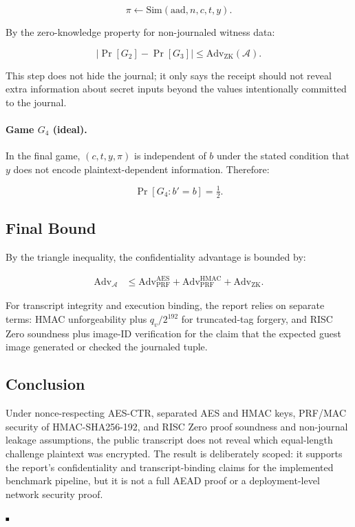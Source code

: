 \[
\pi \leftarrow \mathrm{Sim}(\mathrm{aad}, n, c, t, y).
\]

By the zero-knowledge property for non-journaled witness data:

\[
|\Pr[G_2] - \Pr[G_3]| \leq
\mathrm{Adv}_{\mathrm{ZK}}(\mathcal{A}).
\]

This step does not hide the journal; it only says the receipt should not reveal
extra information about secret inputs beyond the values intentionally committed
to the journal.

\paragraph{Game \(G_4\) (ideal).}
In the final game, \((c, t, y, \pi)\) is independent of \(b\) under the stated
condition that \(y\) does not encode plaintext-dependent information. Therefore:

\[
\Pr[G_4 : b' = b] = \tfrac{1}{2}.
\]

\subsection{Final Bound}

By the triangle inequality, the confidentiality advantage is bounded by:

\begin{align*}
\mathrm{Adv}_{\mathcal{A}}
&\leq \mathrm{Adv}_{\mathrm{PRF}}^{\mathrm{AES}}
+ \mathrm{Adv}_{\mathrm{PRF}}^{\mathrm{HMAC}}
+ \mathrm{Adv}_{\mathrm{ZK}}.
\end{align*}

For transcript integrity and execution binding, the report relies on separate
terms: HMAC unforgeability plus \(q_v / 2^{192}\) for truncated-tag forgery, and
RISC Zero soundness plus image-ID verification for the claim that the expected
guest image generated or checked the journaled tuple.

\subsection{Conclusion}

Under nonce-respecting AES-CTR, separated AES and HMAC keys, PRF/MAC security of
HMAC-SHA256-192, and RISC Zero proof soundness and non-journal leakage
assumptions, the public transcript does not reveal which equal-length challenge
plaintext was encrypted. The result is deliberately scoped: it supports the
report's confidentiality and transcript-binding claims for the implemented
benchmark pipeline, but it is not a full AEAD proof or a deployment-level network
security proof.

\hfill \(\rule{0.8ex}{0.8ex}\)
